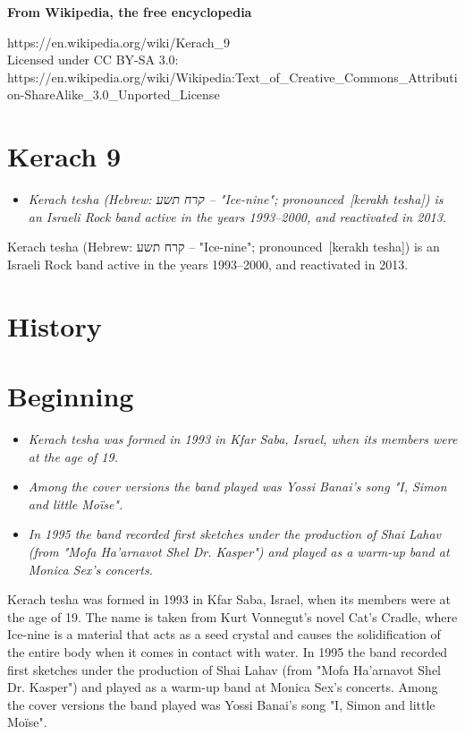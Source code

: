\textbf{From Wikipedia, the free encyclopedia}

https://en.wikipedia.org/wiki/Kerach\_9\\
Licensed under CC BY-SA 3.0:\\
https://en.wikipedia.org/wiki/Wikipedia:Text\_of\_Creative\_Commons\_Attribution-ShareAlike\_3.0\_Unported\_License

\section{Kerach 9}\label{kerach-9}

\begin{itemize}
\item
  \emph{Kerach tesha (Hebrew: קרח תשע‎ -- "Ice-nine";
  pronounced~{[}kerakh tesha{]}) is an Israeli Rock band active in the
  years 1993--2000, and reactivated in 2013.}
\end{itemize}

Kerach tesha (Hebrew: קרח תשע‎ -- "Ice-nine"; pronounced~{[}kerakh
tesha{]}) is an Israeli Rock band active in the years 1993--2000, and
reactivated in 2013.

\section{History}\label{history}

\section{Beginning}\label{beginning}

\begin{itemize}
\item
  \emph{Kerach tesha was formed in 1993 in Kfar Saba, Israel, when its
  members were at the age of 19.}
\item
  \emph{Among the cover versions the band played was Yossi Banai's song
  "I, Simon and little Moïse".}
\item
  \emph{In 1995 the band recorded first sketches under the production of
  Shai Lahav (from "Mofa Ha'arnavot Shel Dr. Kasper") and played as a
  warm-up band at Monica Sex's concerts.}
\end{itemize}

Kerach tesha was formed in 1993 in Kfar Saba, Israel, when its members
were at the age of 19. The name is taken from Kurt Vonnegut's novel
Cat's Cradle, where Ice-nine is a material that acts as a seed crystal
and causes the solidification of the entire body when it comes in
contact with water. In 1995 the band recorded first sketches under the
production of Shai Lahav (from "Mofa Ha'arnavot Shel Dr. Kasper") and
played as a warm-up band at Monica Sex's concerts. Among the cover
versions the band played was Yossi Banai's song "I, Simon and little
Moïse".

